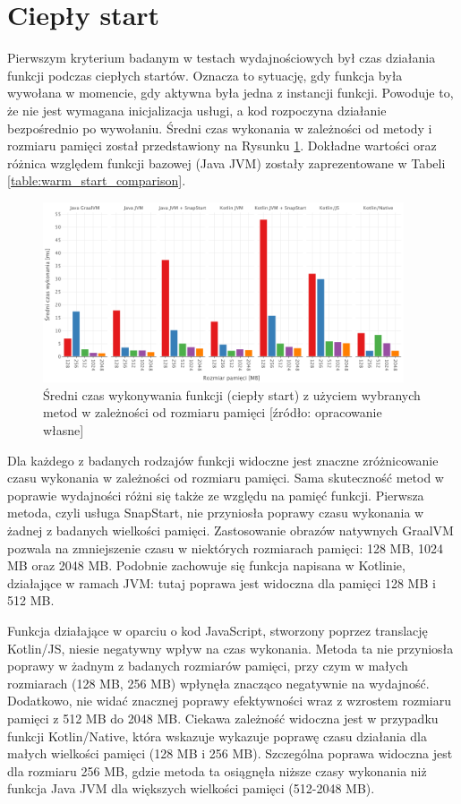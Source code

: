 \section{Ciepły start}\label{chapter:results_warm_start}

Pierwszym kryterium badanym w testach wydajnościowych był czas działania funkcji podczas ciepłych startów.
Oznacza to sytuację, gdy funkcja była wywołana w momencie, gdy aktywna była jedna z instancji funkcji.
Powoduje to, że nie jest wymagana inicjalizacja usługi, a kod rozpoczyna działanie bezpośrednio po wywołaniu.
Średni czas wykonania w zależności od metody i rozmiaru pamięci został przedstawiony na Rysunku \ref{fig:avg_warm_start}.
Dokładne wartości oraz różnica względem funkcji bazowej (Java JVM) zostały zaprezentowane w Tabeli \ref{table:warm_start_comparison}.

\begin{figure}[h]
    \centering
    \includegraphics[width=0.95\textwidth]{charts/results/avg-warm-start.png}
    \caption{Średni czas wykonywania funkcji (ciepły start) z użyciem wybranych metod w zależności od rozmiaru pamięci [źródło: opracowanie własne]}
    \label{fig:avg_warm_start}
\end{figure}

Dla każdego z badanych rodzajów funkcji widoczne jest znaczne zróżnicowanie czasu wykonania w zależności od rozmiaru pamięci.
Sama skuteczność metod w poprawie wydajności różni się także ze względu na pamięć funkcji.
Pierwsza metoda, czyli usługa SnapStart, nie przyniosła poprawy czasu wykonania w żadnej z badanych wielkości pamięci.
Zastosowanie obrazów natywnych GraalVM pozwala na zmniejszenie czasu w niektórych rozmiarach pamięci: 128 MB, 1024 MB oraz 2048 MB.
Podobnie zachowuje się funkcja napisana w Kotlinie, działające w ramach JVM: tutaj poprawa jest widoczna dla pamięci 128 MB i 512 MB.

Funkcja działające w oparciu o kod JavaScript, stworzony poprzez translację Kotlin/JS, niesie negatywny wpływ na czas wykonania.
Metoda ta nie przyniosła poprawy w żadnym z badanych rozmiarów pamięci, przy czym w małych rozmiarach (128 MB, 256 MB) wpłynęła znacząco negatywnie na wydajność.
Dodatkowo, nie widać znacznej poprawy efektywności wraz z wzrostem rozmiaru pamięci z 512 MB do 2048 MB. 
Ciekawa zależność widoczna jest w przypadku funkcji Kotlin/Native, która wskazuje wykazuje poprawę czasu działania dla małych wielkości pamięci (128 MB i 256 MB).
Szczególna poprawa widoczna jest dla rozmiaru 256 MB, gdzie metoda ta osiągnęła niższe czasy wykonania niż funkcja Java JVM dla większych wielkości pamięci (512-2048 MB).

